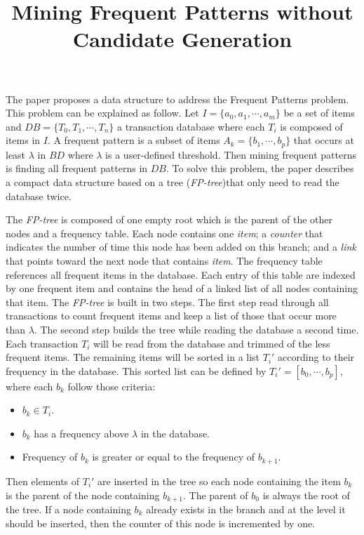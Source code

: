 \documentclass{article}
\title{Mining Frequent Patterns without Candidate Generation}
\begin{document}
\maketitle
The paper proposes a data structure to address the Frequent Patterns problem.
This problem can be explained as follow.
Let $I = \{a_0, a_1, \cdots, a_m\}$ be a set of items and $DB = \{T_0, T_1, \cdots, T_n\}$ a transaction database where each $T_i$ is composed of items in $I$.
A frequent pattern is a subset of items $A_k = \{b_1, \cdots, b_p\}$ that occurs at least $\lambda$ in $BD$ where $\lambda$ is a user-defined threshold.
Then mining frequent patterns is finding all frequent patterns in $DB$.
To solve this problem, the paper describes a compact data structure based on a tree (\textit{FP-tree})that only need to read the database twice.

The \textit{FP-tree} is composed of one empty root which is the parent of the other nodes and a frequency table.
Each node contains one \textit{item}; a \textit{counter} that indicates the number of time this node has been added on this branch;
and a \textit{link} that points toward the next node that contains \textit{item}.
The frequency table references all frequent items in the database.
Each entry of this table are indexed by one frequent item and contains the head of a linked list of all nodes containing that item.
The \textit{FP-tree} is built in two steps.
The first step read through all transactions to count frequent items and keep a list of those that occur more than $\lambda$.
The second step builds the tree while reading the database a second time.
Each transaction $T_i$ will be read from the database and trimmed of the less frequent items.
The remaining items will be sorted in a list $T_i'$ according to their frequency in the database.
This sorted list can be defined by $T_i' = [b_0, \cdots, b_p]$, where each $b_k$ follow those criteria:
\begin{itemize}
	\item $b_k \in T_i$.
	\item $b_k$ has a frequency above $\lambda$ in the database.
	\item Frequency of $b_k$ is greater or equal to the frequency of $b_{k+1}$.
\end{itemize}
Then elements of $T_i'$ are inserted in the tree so each node containing the item $b_k$ is the parent of the node containing $b_{k+1}$.
The parent of $b_0$ is always the root of the tree.
If a node containing $b_k$ already exists in the branch and at the level it should be inserted, then the counter of this node is incremented by one. 
\end{document}
